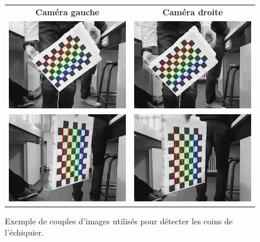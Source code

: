 \documentclass{article}
\begin{document}
\begin{figure}
    \begin{center}
        \begin{tabular}{cc}
            \textbf{Caméra gauche} & \textbf{Caméra droite} \\
            \includegraphics[width=0.4\linewidth]{rcs/chess0l.png} & \includegraphics[width=0.4\linewidth]{rcs/chess0r.png} \\
            \includegraphics[width=0.4\linewidth]{rcs/chess1l.png} & \includegraphics[width=0.4\linewidth]{rcs/chess1r.png} \\
        \end{tabular}
    \end{center}
    \caption{Exemple de couples d'images utilisés pour détecter les coins de l'échiquier.}
    \label{chess}
\end{figure}
\end{document}
